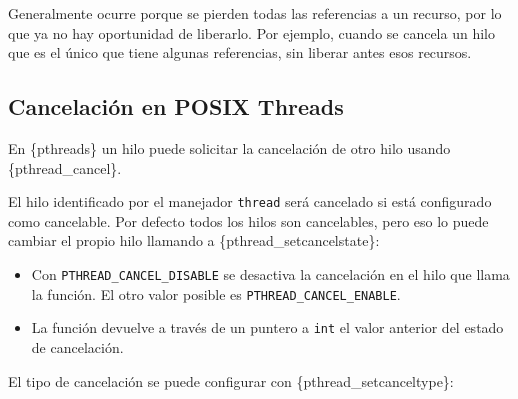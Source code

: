 Generalmente ocurre porque se pierden todas las referencias a un
recurso, por lo que ya no hay oportunidad de liberarlo. Por ejemplo,
cuando se cancela un hilo que es el único que tiene algunas referencias,
sin liberar antes esos recursos.

\subsection{Cancelación en POSIX
Threads}\label{_cancelaciuxf3n_en_posix_threads}

En \{pthreads\} un hilo puede solicitar la cancelación de otro hilo
usando \{pthread\_cancel\}.

\begin{Shaded}
\begin{Highlighting}[]
\OperatorTok{=}\OperatorTok{(}\OperatorTok{);}
\end{Highlighting}
\end{Shaded}

El hilo identificado por el manejador \texttt{thread} será cancelado si
está configurado como cancelable. Por defecto todos los hilos son
cancelables, pero eso lo puede cambiar el propio hilo llamando a
\{pthread\_setcancelstate\}:

\begin{Shaded}
\begin{Highlighting}[]
\OperatorTok{=}\OperatorTok{(}
\OperatorTok{,} 
    \OperatorTok{\&}
\OperatorTok{);}
\end{Highlighting}
\end{Shaded}

\begin{itemize}
\item
  Con \texttt{PTHREAD\_CANCEL\_DISABLE} se desactiva la cancelación en
  el hilo que llama la función. El otro valor posible es
  \texttt{PTHREAD\_CANCEL\_ENABLE}.
\item
  La función devuelve a través de un puntero a \texttt{int} el valor
  anterior del estado de cancelación.
\end{itemize}

El tipo de cancelación se puede configurar con
\{pthread\_setcanceltype\}:

\begin{Shaded}
\begin{Highlighting}[]
\OperatorTok{=}\OperatorTok{(}
\OperatorTok{,}    
    \OperatorTok{\&}
\OperatorTok{);}
\end{Highlighting}
\end{Shaded}

